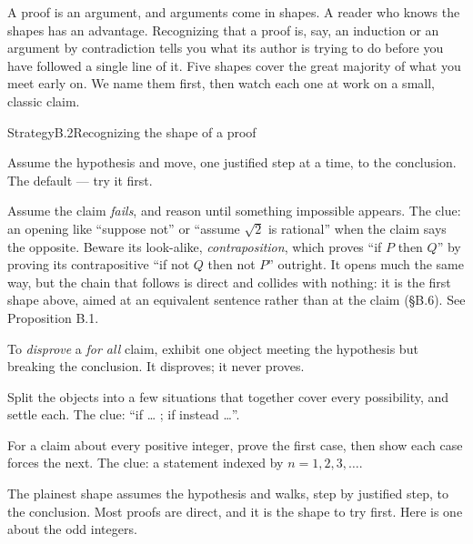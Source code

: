 \documentclass[a4paper,12pt,oneside]{memoir}
\begin{document}
A proof is an argument, and arguments come in shapes. A reader who knows the shapes has an advantage. Recognizing that a proof is, say, an induction or an argument by contradiction tells you what its author is trying to do before you have followed a single line of it. Five shapes cover the great majority of what you meet early on. We name them first, then watch each one at work on a small, classic claim.

\begin{envstrategy}{Strategy}{B.2}{Recognizing the shape of a proof}
\begin{bulletsteps}
  \item {} Assume the hypothesis and move, one justified step at a time, to the conclusion. The default — try it first.
  \item {} Assume the claim \emph{fails}, and reason until something impossible appears. The clue: an opening like “suppose not” or “assume \(\sqrt{2}\) is rational” when the claim says the opposite. Beware its look-alike, \emph{contraposition}, which proves “if \(P\) then \(Q\)” by proving its contrapositive “if not \(Q\) then not \(P\)” outright. It opens much the same way, but the chain that follows is direct and collides with nothing: it is the first shape above, aimed at an equivalent sentence rather than at the claim (§B.6). See Proposition B.1.
  \item {} To \emph{disprove} a \emph{for all} claim, exhibit one object meeting the hypothesis but breaking the conclusion. It disproves; it never proves.
  \item {} Split the objects into a few situations that together cover every possibility, and settle each. The clue: “if … ; if instead …”.
  \item {} For a claim about every positive integer, prove the first case, then show each case forces the next. The clue: a statement indexed by \(n = 1, 2, 3, \ldots\).
\end{bulletsteps}
\end{envstrategy}
 The plainest shape assumes the hypothesis and walks, step by justified step, to the conclusion. Most proofs are direct, and it is the shape to try first. Here is one about the odd integers.
\end{document}
